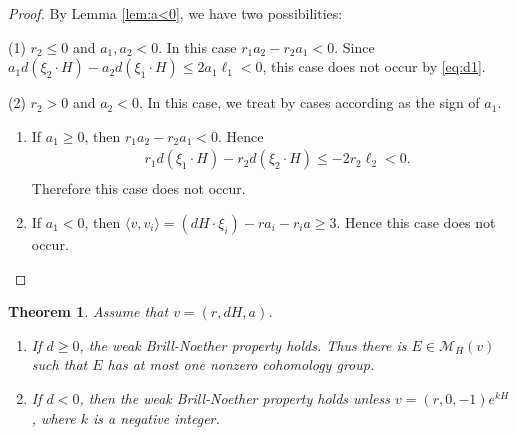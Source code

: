 \documentclass[10pt]{amsart}
\def\cal{\mathcal}
\numberwithin{equation}{section}
\theoremstyle{plain}
\newtheorem{thm}{Theorem}[section]
\theoremstyle{definition}
\theoremstyle{remark}
\begin{document}
\begin{proof}
By Lemma \ref{lem:a<0}, we have two possibilities:

(1)
$r_2 \leq 0$ and $a_1,a_2<0$.
In this case $r_1 a_2-r_2 a_1<0$.
Since $a_1 d(\xi_2 \cdot H)-a_2 d(\xi_1 \cdot H) \leq 2a_1 \ell_1<0$,
this case does not occur by \eqref{eq:d1}.

(2)
$r_2>0$ and $a_2<0$. 
In this case, we treat by cases according as the sign of $a_1$.
\begin{enumerate}
\item
If $a_1 \geq 0$, then
$r_1 a_2-r_2 a_1<0$.
Hence 
\begin{equation}
\begin{split}
& r_1 d(\xi_1 \cdot H)-r_2 d(\xi_2 \cdot H) \leq -2r_2 \ell_2<0.\\
\end{split}
\end{equation}
Therefore this case does not occur.
\item
If $a_1<0$, then 
$\langle v,v_i \rangle=(dH \cdot \xi_i)-ra_i-r_i a \geq 3$.
Hence this case does not occur.
\end{enumerate}
\end{proof}





\begin{thm}\label{thm:wBN}
Assume that $v=(r,dH,a)$.
\begin{enumerate}
\item[(1)] 
If $d \geq 0$,
the weak Brill-Noether property holds.
Thus there is $E \in {\cal M}_H(v)$ such that $E$ has at most one nonzero cohomology
group.
\item[(2)]
If $d<0$, then
the weak Brill-Noether property holds unless $v=(r,0,-1)e^{kH}$, where
$k$ is a negative integer.
\end{enumerate}
\end{thm}

\end{document}
